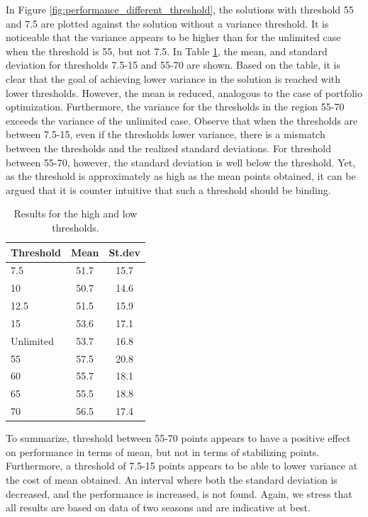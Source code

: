 In Figure \ref{fig:performance_different_threshold}, the solutions with threshold 55 and 7.5 are plotted against the solution without a variance threshold. It is noticeable that the variance appears to be higher than for the unlimited case when the threshold is 55, but not 7.5. In Table \ref{tab_high_low_thresholds}, the mean, and standard deviation for thresholds 7.5-15 and 55-70 are shown. Based on the table, it is clear that the goal of achieving lower variance in the solution is reached with lower thresholds. However, the mean is reduced, analogous to the case of portfolio optimization. Furthermore, the variance for the thresholds in the region 55-70 exceeds the variance of the unlimited case. Observe that when the thresholds are between 7.5-15, even if the thresholds lower variance, there is a mismatch between the thresholds and the realized standard deviations. For threshold between 55-70, however, the standard deviation is well below the threshold. Yet, as the threshold is approximately as high as the mean points obtained, it can be argued that it is counter intuitive that such a threshold should be binding.

\begin{table}[H]
\centering
\begin{tabular}{@{}lcc@{}}
\toprule
Threshold & Mean & St.dev \\ \midrule
7.5       & 51.7 & 15.7   \\
10        & 50.7 & 14.6   \\        %
12.5      & 51.5 & 15.9   \\
15        & 53.6 & 17.1   \\
Unlimited & 53.7 & 16.8   \\
55        & 57.5 & 20.8   \\
60        & 55.7 & 18.1   \\
65        & 55.5 & 18.8   \\
70        & 56.5 & 17.4   \\ \bottomrule 
\end{tabular}
\caption{Results for the high and low thresholds.}
\label{tab_high_low_thresholds}
\end{table}

\newpar

To summarize, threshold between 55-70 points appears to have a positive effect on performance in terms of mean, but not in terms of stabilizing points. Furthermore, a threshold of 7.5-15 points appears to be able to lower variance at the cost of mean obtained. An interval where both the standard deviation is decreased, and the performance is increased, is not found. Again, we stress that all results are based on data of two seasons and are indicative at best.







